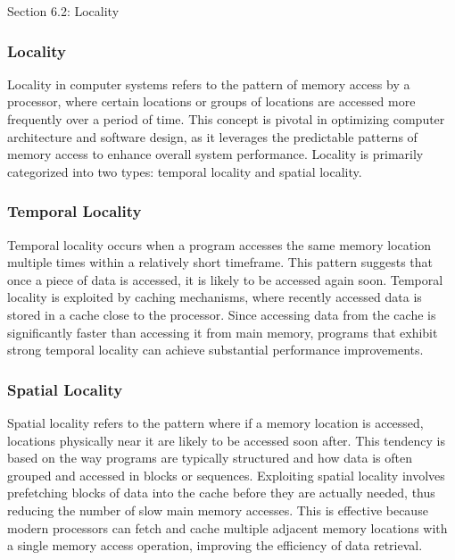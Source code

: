 \begin{notes}{Section 6.2: Locality}
    \subsubsection*{Locality}

    Locality in computer systems refers to the pattern of memory access by a processor, where certain locations or groups of locations are accessed more frequently over a period of time. This concept 
    is pivotal in optimizing computer architecture and software design, as it leverages the predictable patterns of memory access to enhance overall system performance. Locality is primarily categorized 
    into two types: temporal locality and spatial locality. \vspace*{1em}
    
    \subsubsection*{Temporal Locality}
    
    Temporal locality occurs when a program accesses the same memory location multiple times within a relatively short timeframe. This pattern suggests that once a piece of data is accessed, it is 
    likely to be accessed again soon. Temporal locality is exploited by caching mechanisms, where recently accessed data is stored in a cache close to the processor. Since accessing data from the 
    cache is significantly faster than accessing it from main memory, programs that exhibit strong temporal locality can achieve substantial performance improvements.
    
    \subsubsection*{Spatial Locality}
    
    Spatial locality refers to the pattern where if a memory location is accessed, locations physically near it are likely to be accessed soon after. This tendency is based on the way programs are 
    typically structured and how data is often grouped and accessed in blocks or sequences. Exploiting spatial locality involves prefetching blocks of data into the cache before they are actually 
    needed, thus reducing the number of slow main memory accesses. This is effective because modern processors can fetch and cache multiple adjacent memory locations with a single memory access 
    operation, improving the efficiency of data retrieval. \vspace*{1em}
    

\end{notes}

